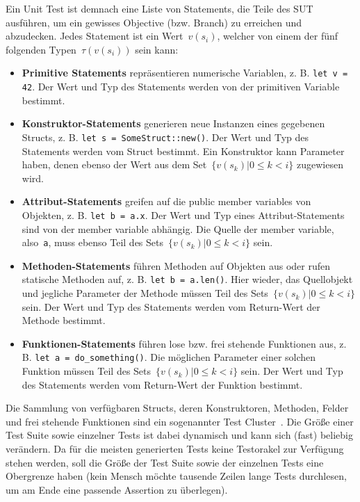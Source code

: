 \documentclass{article}
\begin{document}
Ein Unit Test ist demnach eine Liste von Statements, die Teile des \ac{SUT} ausführen, um ein gewisses Objective (bzw. Branch) zu erreichen und abzudecken. Jedes Statement ist ein Wert~$v(s_i)$, welcher von einem der fünf folgenden Typen~$\tau(v(s_i))$ sein kann:
\begin{itemize}
	\item \textbf{Primitive Statements} repräsentieren numerische Variablen, z. B. \lstinline{let v = 42}. Der Wert und Typ des Statements werden von der primitiven Variable bestimmt. 
	\item \textbf{Konstruktor-Statements} generieren neue Instanzen eines gegebenen Structs, z. B. \lstinline{let s = SomeStruct::new()}. Der Wert und Typ des Statements werden vom Struct bestimmt. Ein Konstruktor kann Parameter haben, denen ebenso der Wert aus dem Set~$\{v(s_k) | 0 \leq k < i\}$ zugewiesen wird.
	\item \textbf{Attribut-Statements} greifen auf die public member variables von Objekten, z. B. \lstinline{let b = a.x}. Der Wert und Typ eines Attribut-Statements sind von der member variable abhängig. Die Quelle der member variable, also~\lstinline{a}, muss ebenso Teil des Sets~$\{v(s_k) | 0 \leq k < i\}$ sein. 
	\item \textbf{Methoden-Statements} führen Methoden auf Objekten aus oder rufen statische Methoden auf, z. B. \lstinline{let b = a.len()}. Hier wieder, das Quellobjekt und jegliche Parameter der Methode müssen Teil des Sets~$\{v(s_k) | 0 \leq k < i\}$ sein. Der Wert und Typ des Statements werden vom Return-Wert der Methode bestimmt. 
	\item \textbf{Funktionen-Statements} führen lose bzw. frei stehende Funktionen aus, z. B. \lstinline{let a = do_something()}. Die möglichen Parameter einer solchen Funktion müssen Teil des Sets~$\{v(s_k) | 0 \leq k < i\}$ sein. Der Wert und Typ des Statements werden vom Return-Wert der Funktion bestimmt. 
\end{itemize}

Die Sammlung von verfügbaren Structs, deren Konstruktoren, Methoden, Felder und frei stehende Funktionen sind ein sogenannter Test Cluster~\cite{Fraser_2011}. Die Größe einer Test Suite sowie einzelner Tests ist dabei dynamisch und kann sich (fast) beliebig verändern. Da für die meisten generierten Tests keine Testorakel zur Verfügung stehen werden, soll die Größe der Test Suite sowie der einzelnen Tests eine Obergrenze haben (kein Mensch möchte tausende Zeilen lange Tests durchlesen, um am Ende eine passende Assertion zu überlegen).
\end{document}
